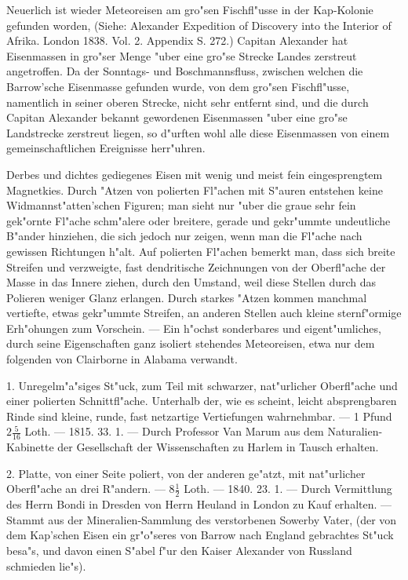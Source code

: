 \documentclass[a4paper, 11pt, oneside, polutonikogreek, german]{article}
\begin{document}
\setlength{\leftskip}{10mm}
\setlength{\parindent}{0pt}

{\footnotesize Neuerlich ist wieder Meteoreisen am gro"sen Fischfl"usse in der Kap-Kolonie gefunden worden, (Siehe: Alexander Expedition of Discovery into the Interior of Afrika. London 1838. Vol. 2. Appendix S. 272.) Capitan Alexander hat Eisenmassen in gro"ser Menge "uber eine gro"se Strecke Landes zerstreut angetroffen. Da der Sonntags- und Boschmannsfluss, zwischen welchen die Barrow'sche Eisenmasse gefunden wurde, von dem gro"sen Fischfl"usse, namentlich in seiner oberen Strecke, nicht sehr entfernt sind, und die durch Capitan Alexander bekannt gewordenen Eisenmassen "uber eine gro"se Landstrecke zerstreut liegen, so d"urften wohl alle diese Eisenmassen von einem gemeinschaftlichen Ereignisse herr"uhren.}

\setlength{\leftskip}{0pt}
\setlength{\parindent}{20pt}

Derbes und dichtes gediegenes Eisen mit wenig und meist fein eingesprengtem Magnetkies. Durch "Atzen von polierten Fl"achen mit S"auren entstehen keine Widmannst"atten'schen Figuren; man sieht nur "uber die graue sehr fein gek"ornte Fl"ache schm"alere oder breitere, gerade und gekr"ummte undeutliche B"ander hinziehen, die sich jedoch nur zeigen, wenn man die Fl"ache nach gewissen Richtungen h"alt. Auf polierten Fl"achen bemerkt man, dass sich breite Streifen und verzweigte, fast dendritische Zeichnungen von der Oberfl"ache der Masse in das Innere ziehen, durch den Umstand, weil diese Stellen durch das Polieren weniger Glanz erlangen. Durch starkes "Atzen kommen manchmal vertiefte, etwas gekr"ummte Streifen, an anderen Stellen auch kleine sternf"ormige Erh"ohungen zum Vorschein. --- Ein h"ochst sonderbares und eigent"umliches, durch seine Eigenschaften ganz isoliert stehendes Meteoreisen, etwa nur dem folgenden von Clairborne in Alabama verwandt.

1. Unregelm"a"siges St"uck, zum Teil mit schwarzer, nat"urlicher Oberfl"ache und einer polierten Schnittfl"ache. Unterhalb der, wie es scheint, leicht absprengbaren Rinde sind kleine, runde, fast netzartige Vertiefungen wahrnehmbar. --- 1 Pfund $2\frac{5}{16}$ Loth. --- 1815. 33. 1. --- Durch Professor Van Marum aus dem Naturalien-Kabinette der Gesellschaft der Wissenschaften zu Harlem in Tausch erhalten.

2. Platte, von einer Seite poliert, von der anderen ge"atzt, mit nat"urlicher Oberfl"ache an drei R"andern. --- $8\frac{1}{2}$ Loth. --- 1840. 23. 1. --- Durch Vermittlung des Herrn Bondi in Dresden von Herrn Heuland in London zu Kauf erhalten. --- Stammt aus der Mineralien-Sammlung des verstorbenen Sowerby Vater, (der von dem Kap'schen Eisen ein gr"o"seres von Barrow nach England gebrachtes St"uck besa"s, und davon einen S"abel f"ur den Kaiser Alexander von Russland schmieden lie"s).
\end{document}
